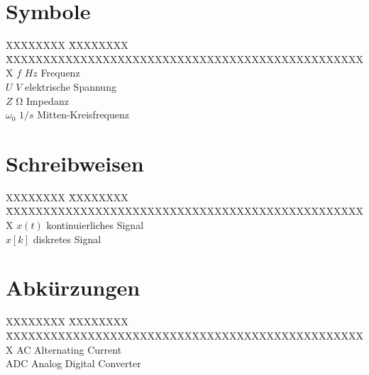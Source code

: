 \label{ch:symbole}

\section*{Symbole}
\begin{tabbing}
XXXXXXXX \= XXXXXXXX \= XXXXXXXXXXXXXXXXXXXXXXXXXXXXXXXXXXXXXXXXXXXXXXXXX \kill
$f$							\> $\si{Hz}$			\> Frequenz \\
$U$							\> $\si{V}$				\> elektrische Spannung \\
$Z$							\> $\si{\ohm}$			\> Impedanz \\

$\omega_0$					\> $\si{1/s}$			\> Mitten-Kreisfrequenz \\
\end{tabbing}

\section*{Schreibweisen}
\begin{tabbing}
XXXXXXXX \= XXXXXXXX \= XXXXXXXXXXXXXXXXXXXXXXXXXXXXXXXXXXXXXXXXXXXXXXXXX \kill
$x(t)$						\> 						\> kontinuierliches Signal \\
$x[k]$						\> 						\> diskretes Signal \\
\end{tabbing}

\section*{Abkürzungen}
\begin{tabbing}
XXXXXXXX \= XXXXXXXX \= XXXXXXXXXXXXXXXXXXXXXXXXXXXXXXXXXXXXXXXXXXXXXXXXX \kill
AC							\>						\> Alternating Current \\
ADC							\> 						\> Analog Digital Converter \\
\end{tabbing}
